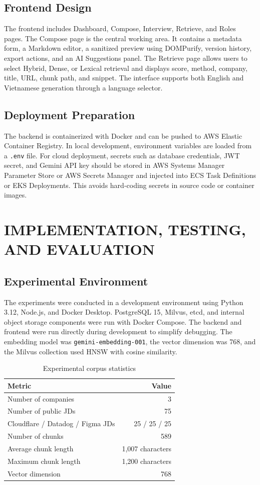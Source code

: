 \documentclass[12pt,a4paper,oneside]{report}
\newcommand{\code}[1]{\texttt{#1}}
\begin{document}
\section{Frontend Design}
The frontend includes Dashboard, Compose, Interview, Retrieve, and Roles pages. The Compose page is the central working area. It contains a metadata form, a Markdown editor, a sanitized preview using DOMPurify, version history, export actions, and an AI Suggestions panel. The Retrieve page allows users to select Hybrid, Dense, or Lexical retrieval and displays score, method, company, title, URL, chunk path, and snippet. The interface supports both English and Vietnamese generation through a language selector.

\section{Deployment Preparation}
The backend is containerized with Docker and can be pushed to AWS Elastic Container Registry. In local development, environment variables are loaded from a \code{.env} file. For cloud deployment, secrets such as database credentials, JWT secret, and Gemini API key should be stored in AWS Systems Manager Parameter Store or AWS Secrets Manager and injected into ECS Task Definitions or EKS Deployments. This avoids hard-coding secrets in source code or container images.

\chapter{IMPLEMENTATION, TESTING, AND EVALUATION}

\section{Experimental Environment}
The experiments were conducted in a development environment using Python 3.12, Node.js, and Docker Desktop. PostgreSQL 15, Milvus, etcd, and internal object storage components were run with Docker Compose. The backend and frontend were run directly during development to simplify debugging. The embedding model was \code{gemini-embedding-001}, the vector dimension was 768, and the Milvus collection used HNSW with cosine similarity.

\begin{table}[H]
\centering
\caption{Experimental corpus statistics}
\label{tab:corpus}
\begin{tabular}{lr}
\toprule
\textbf{Metric} & \textbf{Value}\\
\midrule
Number of companies & 3\\
Number of public JDs & 75\\
Cloudflare / Datadog / Figma JDs & 25 / 25 / 25\\
Number of chunks & 589\\
Average chunk length & 1,007 characters\\
Maximum chunk length & 1,200 characters\\
Vector dimension & 768\\
\bottomrule
\end{tabular}
\end{table}
\end{document}
